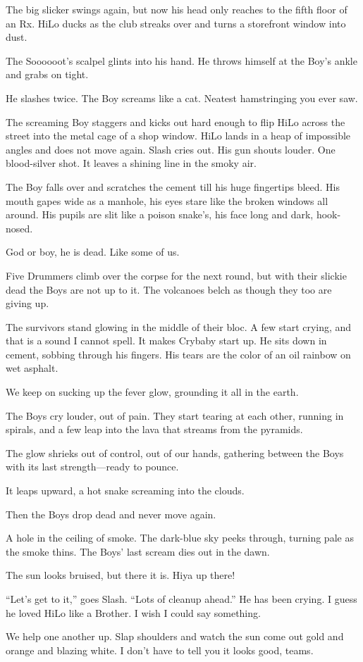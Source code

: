 The big slicker swings again, but now his head only reaches to the fifth floor of an Rx. HiLo ducks as the club streaks over and turns a storefront window into dust.

The Soooooot's scalpel glints into his hand. He throws himself at the Boy's ankle and grabs on tight.

He slashes twice. The Boy screams like a cat. Neatest hamstringing you ever saw.

The screaming Boy staggers and kicks out hard enough to flip HiLo across the street into the metal cage of a shop window. HiLo lands in a heap of impossible angles and does not move again. Slash cries out. His gun shouts louder. One blood-silver shot. It leaves a shining line in the smoky air.

The Boy falls over and scratches the cement till his huge fingertips bleed. His mouth gapes wide as a manhole, his eyes stare like the broken windows all around. His pupils are slit like a poison snake's, his face long and dark, hook-nosed.

God or boy, he is dead. Like some of us.

Five Drummers climb over the corpse for the next round, but with their slickie dead the Boys are not up to it. The volcanoes belch as though they too are giving up.

The survivors stand glowing in the middle of their bloc. A few start crying, and that is a sound I cannot spell. It makes Crybaby start up. He sits down in cement, sobbing through his fingers. His tears are the color of an oil rainbow on wet asphalt.

We keep on sucking up the fever glow, grounding it all in the earth.

The Boys cry louder, out of pain. They start tearing at each other, running in spirals, and a few leap into the lava that streams from the pyramids.

The glow shrieks out of control, out of our hands, gathering between the Boys with its last strength—ready to pounce.

It leaps upward, a hot snake screaming into the clouds.

Then the Boys drop dead and never move again.

A hole in the ceiling of smoke. The dark-blue sky peeks through, turning pale as the smoke thins. The Boys' last scream dies out in the dawn.

The sun looks bruised, but there it is. Hiya up there!

``Let's get to it,'' goes Slash. ``Lots of cleanup ahead.'' He has been crying. I guess he loved HiLo like a Brother. I wish I could say something.

We help one another up. Slap shoulders and watch the sun come out gold and orange and blazing white. I don't have to tell you it looks good, teams.